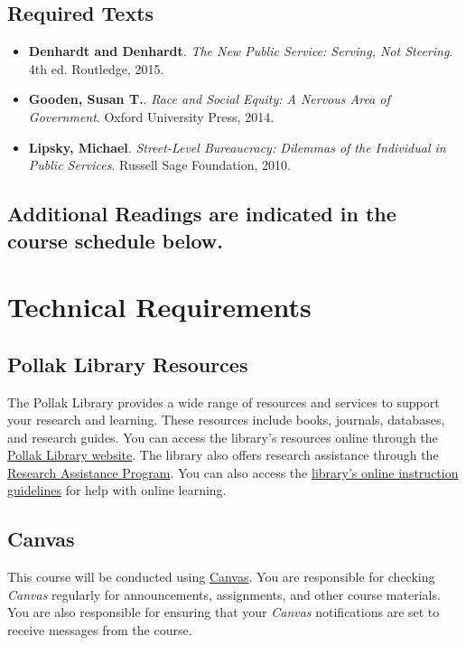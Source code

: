 \documentclass[12pt, letterpaper]{article}
\begin{document}
    \subsection*{Required Texts}
    \begin{itemize}
        \item \textbf{Denhardt and Denhardt}. \textit{The New Public Service: Serving, Not Steering}. 4th ed. Routledge, 2015.
        \item \textbf{Gooden, Susan T.}. \textit{Race and Social Equity: A Nervous Area of Government}. Oxford University Press, 2014.
        \item \textbf{Lipsky, Michael}. \textit{Street-Level Bureaucracy: Dilemmas of the Individual in Public Services}. Russell Sage Foundation, 2010.
    \end{itemize}

\subsection*{Additional Readings are indicated in the course schedule below.}

\section{Technical Requirements}

\subsection*{Pollak Library Resources}

The Pollak Library provides a wide range of resources and services to support your research and learning. These resources include books, journals, databases, and research guides. You can access the library's resources online through the \href{http://www.library.fullerton.edu/}{Pollak Library website}. The library also offers research assistance through the \href{http://www.library.fullerton.edu/research/}{Research Assistance Program}. You can also access the \href{http://www.library.fullerton.edu/about/guidelines/online-instruction-guidelines.php}{library's online instruction guidelines} for help with online learning.

\subsection*{Canvas}

This course will be conducted using \href{https://csufullerton.instructure.com/}{Canvas}. You are responsible for checking \emph{Canvas} regularly for announcements, assignments, and other course materials. You are also responsible for ensuring that your \emph{Canvas} notifications are set to receive messages from the course. 
\end{document}
